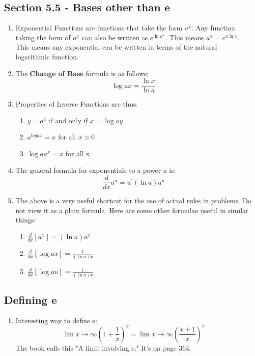 \documentclass[11pt]{article}
\begin{document}
\subsection{Section 5.5 - Bases other than e}
\begin{enumerate}
	\item Exponential Functions are functions that take the form $a^x$.  Any function taking the form of $a^x$ can also be written as $e^{\ln a^x}$.  This means $a^x = e^{a\ln x}$.  This means any exponential can be written in terms of the natural logarithmic function.
	\item The {\bf Change of Base} formula is as follows:
	$$ \log{a}{x} = \frac{\ln x}{\ln a} $$
	\item Properties of Inverse Functions are thus:
	\begin{enumerate}
		\item $y = a^x$ if and only if $x = \log{a}{y}$
		\item $a^{log{a}{x}} = x$ for all $x>0$
		\item $\log{a}{a^x} = x$ for all x
	\end{enumerate}
	\item The general formula for exponentials to a power u is:
	$$ \frac{d}{dx} a^u = u^\prime(\ln a)a^u $$
	\item The above is a very useful shortcut for the use of actual rules in problems.  Do not view it as a plain formula.  Here are some other formulae useful in similar things:
	\begin{enumerate}
		\item $ \frac{d}{dx}[a^x] = (\ln a ) a^x $
		\item $ \frac{d}{dx}[\log{a}{x}] = \frac{1}{(\ln a )x} $
		\item $ \frac{d}{dx}[\log{a}{u}] = \frac{1}{(\ln a )x} $
	\end{enumerate}
\end{enumerate}
\subsection{Defining e}
\begin{enumerate}
	\item Interesting way to define e:
	$$ \lim x \to \infty \left( 1 + \frac{1}{x}\right)^x = \lim x \to \infty \left( \frac{x+1}{x}\right)^x $$
	The book calls this "A limit involving e." It's on page 364.
\end{enumerate}
\end{document}
